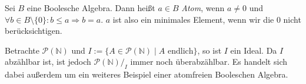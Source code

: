 \begin{definition}
    Sei $B$ eine Boolesche Algebra. Dann heißt $a \in B$ \emph{Atom}, wenn $a \neq 0$ und $\forall b \in B\setminus\{0\}: b \le a\Rightarrow b=a$. $a$ ist also ein minimales Element, wenn wir die 0 nicht berücksichtigen.
\end{definition}

\begin{example}
    Betrachte $\mathcal{P}(\mathbb{N})$ und $I := \{ A \in \mathcal{P}(\mathbb{N}) \mid A \text{ endlich} \}$, so ist $I$ ein Ideal. Da $I$ abzählbar ist, ist jedoch $\mathcal{P}(\mathbb{N}) /_I$ immer noch überabzählbar. Es handelt sich dabei außerdem um ein weiteres Beispiel einer atomfreien Booleschen Algebra.
\end{example}